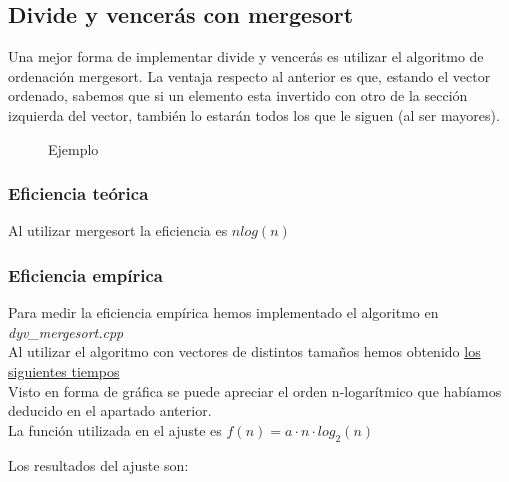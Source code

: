 \subsection{Divide y vencerás con mergesort}
Una mejor forma de implementar divide y vencerás es utilizar el algoritmo de ordenación mergesort. La ventaja respecto al anterior es que, estando el vector ordenado, sabemos que si un elemento esta invertido con otro de la sección izquierda del vector, también lo estarán todos los que le siguen (al ser mayores).

\begin{figure}[h] 
\centering
	\caption{Ejemplo} 
\end{figure}

\subsubsection{Eficiencia teórica}
Al utilizar mergesort la eficiencia es $nlog(n)$

\subsubsection{Eficiencia empírica}
Para medir la eficiencia empírica hemos implementado el algoritmo en \textit{dyv\_mergesort.cpp}\\

Al utilizar el algoritmo con vectores de distintos tamaños hemos obtenido \hyperref[tabla_comp]{{\color{blue} los siguientes tiempos}}\\

Visto en forma de gráfica se puede apreciar el orden n-logarítmico que habíamos deducido en el apartado anterior.\\

La función utilizada en el ajuste es $f(n) = a \cdot n \cdot log_2(n)$

Los resultados del ajuste son:\\

